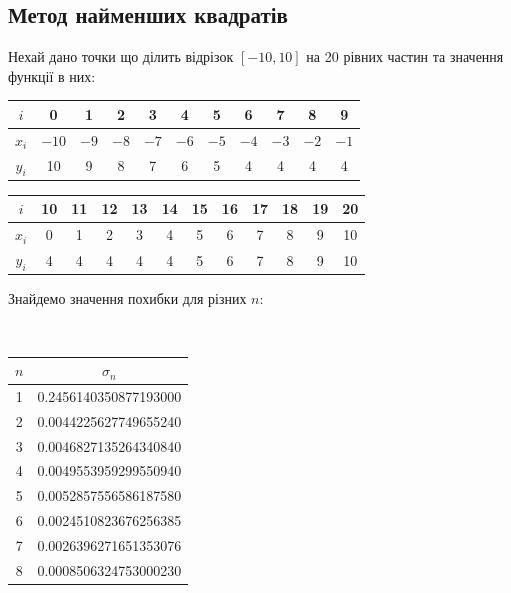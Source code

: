 \newpage

\subsection{Метод найменших квадратів}

Нехай дано точки що ділить відрізок $[-10, 10]$ на 20 рівних частин та значення функції в них:

\begin{table}[H]
    \centering
    \begin{tabular}{|c|c|c|c|c|c|c|c|c|c|c|} \hline
        $i$ & 0 & 1 & 2 & 3 & 4 & 5 & 6 & 7 & 8 & 9 \\ \hline
        $x_i$ & $-10$ & $-9$ & $-8$ & $-7$ & $-6$ & $-5$ & $-4$ & $-3$ & $-2$ & $-1$ \\ \hline 
        $y_i$ & 10 & 9 & 8 & 7 & 6 & 5 & 4 & 4 & 4 & 4 \\ \hline
    \end{tabular}
    \break
    \hfill 
    \break
    \begin{tabular}{|c|c|c|c|c|c|c|c|c|c|c|c|} \hline
        $i$ & 10 & 11 & 12 & 13 & 14 & 15 & 16 & 17 & 18 & 19 & 20 \\ \hline
        $x_i$ & 0 & 1 & 2 & 3 & 4 & 5 & 6 & 7 & 8 & 9 & 10 \\ \hline
        $y_i$ & 4 & 4 & 4 & 4 & 4 & 5 & 6 & 7 & 8 & 9 & 10 \\ \hline
    \end{tabular}
\end{table}

Знайдемо значення похибки для різних $n$:

\begin{table}[H]
    \tt
    \centering
    \begin{tabular}{|c|c|} \hline
        $n$ & $\sigma_n$ \\ \hline
        1 & 0.2456140350877193000 \\ \hline
        2 & 0.0044225627749655240 \\ \hline
        3 & 0.0046827135264340840 \\ \hline
        4 & 0.0049553959299550940 \\ \hline
        5 & 0.0052857556586187580 \\ \hline
        6 & 0.0024510823676256385 \\ \hline
        7 & 0.0026396271651353076 \\ \hline
        8 & 0.0008506324753000230 \\ \hline
    \end{tabular}
\end{table}

